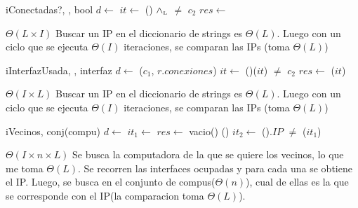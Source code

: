\begin{Algoritmos}
  \begin{algoritmo}{iConectadas?}{, , }{bool}{}
     $d \gets$  
     $it \gets$  
    \While(){ $\land_{\mathrm{\scriptscriptstyle{L}}}$  $\neq$ $c_2$}{
       
    }
    $res \gets$  
  \end{algoritmo}
  \datosAlgoritmo{} %
  {} %
  {} %
  {$\Theta(L \times I)$} %
  {Buscar un IP en el diccionario de strings es $\Theta(L)$. Luego con un ciclo que se ejecuta $\Theta(I)$ iteraciones, se comparan las IPs (toma $\Theta(L)$)} %

  \begin{algoritmo}{iInterfazUsada}{, , }{interfaz}{}
     $d \gets$ \obtener($c_1$, $r.conexiones$) 
     $it \gets$  
    \While(){\sigSignif($it$) $\neq$ $c_2$}{
       
    }
    $res \gets$ \sigClave($it$) 
  \end{algoritmo}  
  \datosAlgoritmo{} %
  {} %
  {} %
  {$\Theta(I \times L)$} %
  {Buscar un IP en el diccionario de strings es $\Theta(L)$. Luego con un ciclo que se ejecuta $\Theta(I)$ iteraciones, se comparan las IPs (toma $\Theta(L)$)} %
  
  \begin{algoritmo}{iVecinos}{, }{conj(compu)}{}
     $d \gets$  
     $it_1 \gets$  
    $res \gets$ vacio() 
    \While(){}{
       $it_2 \gets$  
      \While(){$.IP$ $\neq$ \sigClave($it_1$)}{
         
      }
       
     } 
  \end{algoritmo}
  \datosAlgoritmo{} %
  {} %
  {} %
  {$\Theta(I \times n \times L)$} %
  {Se busca la computadora de la que se quiere los vecinos, lo que me toma $\Theta(L)$. Se recorren las interfaces ocupadas y para cada una se obtiene el IP. Luego, se busca en el conjunto de compus($\Theta(n)$), cual de ellas es la que se corresponde con el IP(la comparacion toma $\Theta(L)$).} %
  


\end{Algoritmos}
